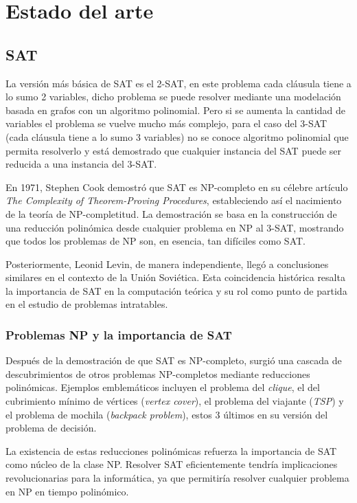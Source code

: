 \documentclass{book}
\begin{document}
\chapter{Estado del arte}

\section{SAT}

La versión más básica de SAT es el 2-SAT, en este problema cada cláusula tiene a lo sumo 2 variables, dicho problema se puede
resolver mediante una modelación basada en grafos con un algoritmo polinomial. Pero si se aumenta la cantidad de variables
el problema se vuelve mucho más complejo, para el caso del 3-SAT (cada cláusula tiene a lo sumo 3 variables) no se conoce algoritmo
polinomial que permita resolverlo y está demostrado que cualquier instancia del SAT puede ser reducida a una instancia del 3-SAT.

En 1971, Stephen Cook demostró que SAT es NP-completo en su célebre artículo \textit{The Complexity of Theorem-Proving Procedures},
estableciendo así el nacimiento de la teoría de NP-completitud. La demostración se basa en la construcción de una
reducción polinómica desde cualquier problema en NP al 3-SAT, mostrando que todos los problemas de NP son, en esencia,
tan difíciles como SAT.

Posteriormente, Leonid Levin, de manera independiente, llegó a conclusiones similares en el contexto de la
Unión Soviética. Esta coincidencia histórica resalta la importancia de SAT en la computación teórica y su rol como
punto de partida en el estudio de problemas intratables.

\subsection{Problemas NP y la importancia de SAT}

Después de la demostración de que SAT es NP-completo, surgió una cascada de descubrimientos de otros problemas
NP-completos mediante reducciones polinómicas. Ejemplos emblemáticos incluyen el problema del \textit{clique},
el del cubrimiento mínimo de vértices (\textit{vertex cover}), el problema del viajante (\textit{TSP}) y el problema de mochila (\textit{backpack problem}),
estos 3 últimos en su versión del problema de decisión.

La existencia de estas reducciones polinómicas refuerza la importancia de SAT como núcleo de la clase NP.
Resolver SAT eficientemente tendría implicaciones revolucionarias para la informática, ya que permitiría resolver
cualquier problema en NP en tiempo polinómico.
\end{document}
